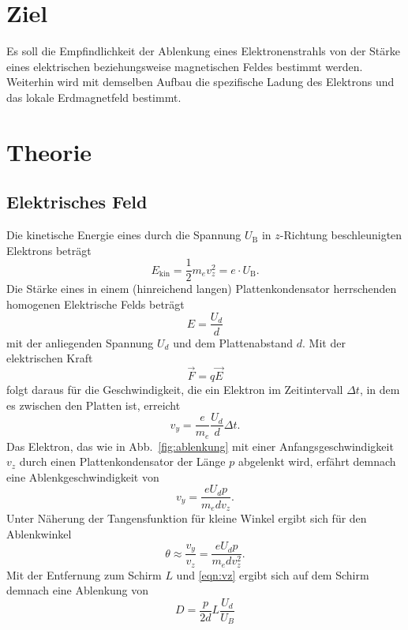 \section{Ziel}
\label{sec:Ziel}
Es soll die Empfindlichkeit der Ablenkung eines Elektronenstrahls von der Stärke eines elektrischen beziehungsweise magnetischen Feldes bestimmt werden. Weiterhin wird mit demselben Aufbau die spezifische Ladung des Elektrons und das lokale Erdmagnetfeld bestimmt.

\section{Theorie}
\label{sec:theorie}

\subsection{Elektrisches Feld}
Die kinetische Energie eines durch die Spannung $U_\text{B}$ in $z$-Richtung beschleunigten Elektrons beträgt
\begin{equation}
  \label{eqn:vz}
  E_\text{kin} = \frac{1}{2} m_e v_z^2 = e \cdot U_\text{B}.
\end{equation}
Die Stärke eines in einem (hinreichend langen) Plattenkondensator herrschenden homogenen Elektrische Felds beträgt
\begin{equation}
  E = \frac{U_d}{d}
\end{equation}
mit der anliegenden Spannung $U_d$ und dem Plattenabstand $d$. Mit der elektrischen Kraft
\begin{equation}
  \vec F  = q \vec E
\end{equation}
folgt daraus für die Geschwindigkeit, die ein Elektron im Zeitintervall $\Delta t$, in dem es zwischen den Platten ist, erreicht
\begin{equation}
  v_y = \frac{e}{m_e} \frac{U_d}{d} \Delta t.
\end{equation}
Das Elektron, das wie in Abb.~\ref{fig:ablenkung} mit einer Anfangsgeschwindigkeit $v_z$ durch einen Plattenkondensator der Länge $p$ abgelenkt wird, erfährt demnach eine Ablenkgeschwindigkeit von
\begin{equation}
  v_y = \frac{e U_d p}{m_e d v_z}.
\end{equation}
Unter Näherung der Tangensfunktion für kleine Winkel ergibt sich für den Ablenkwinkel
\begin{equation}
  \theta \approx \frac{v_y}{v_z} = \frac{e U_d p}{m_e d v_z^2}.
\end{equation}
Mit der Entfernung zum Schirm $L$ und \eqref{eqn:vz} ergibt sich auf dem Schirm demnach eine Ablenkung von
\begin{equation}
  \label{eqn:prop}
  D = \frac{p}{2d} L \frac{U_d}{U_B}
\end{equation}

